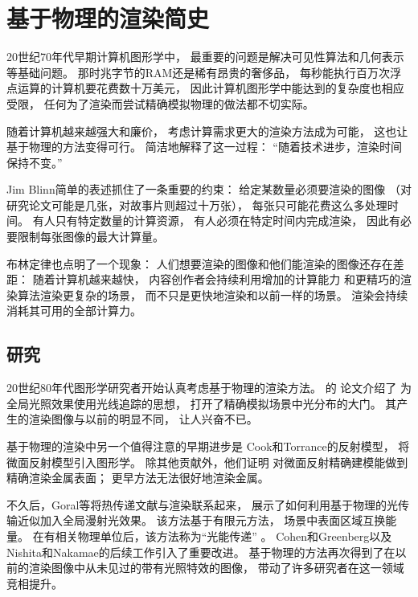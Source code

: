 \section{基于物理的渲染简史}\label{sec:基于物理的渲染简史}

20世纪70年代早期计算机图形学中，
最重要的问题是解决可见性算法和几何表示等基础问题。
那时兆字节的RAM还是稀有昂贵的奢侈品，
每秒能执行百万次浮点运算的计算机要花费数十万美元，
因此计算机图形学中能达到的复杂度也相应受限，
任何为了渲染而尝试精确模拟物理的做法都不切实际。

随着计算机越来越强大和廉价，
考虑计算需求更大的渲染方法成为可能，
这也让基于物理的方法变得可行。
简洁地解释了这一过程：
“随着技术进步，渲染时间保持不变。”

Jim Blinn简单的表述抓住了一条重要的约束：
给定某数量必须要渲染的图像
（对研究论文可能是几张，对故事片则超过十万张），
每张只可能花费这么多处理时间。
有人只有特定数量的计算资源，
有人必须在特定时间内完成渲染，
因此有必要限制每张图像的最大计算量。

布林定律也点明了一个现象：
人们想要渲染的图像和他们能渲染的图像还存在差距：
随着计算机越来越快，
内容创作者会持续利用增加的计算能力
和更精巧的渲染算法渲染更复杂的场景，
而不只是更快地渲染和以前一样的场景。
渲染会持续消耗其可用的全部计算力。

\subsection{研究}\label{sub:研究}
20世纪80年代图形学研究者开始认真考虑基于物理的渲染方法。
\citeauthor{10.1145/358876.358882}的
论文\parencite*{10.1145/358876.358882}介绍了
为全局光照效果使用光线追踪的思想，
打开了精确模拟场景中光分布的大门。
其产生的渲染图像与以前的明显不同，
让人兴奋不已。

基于物理的渲染中另一个值得注意的早期进步是
Cook和Torrance的反射模型\parencite*{10.1145/800224.806819,10.1145/357290.357293}，
将微面反射模型引入图形学。
除其他贡献外，他们证明
对微面反射精确建模能做到精确渲染金属表面；
更早方法无法很好地渲染金属。

不久后，Goral等\parencite*{10.1145/800031.808601}将热传递文献与渲染联系起来，
展示了如何利用基于物理的光传输近似加入全局漫射光效果。
该方法基于有限元方法，
场景中表面区域互换能量。
在有相关物理单位后，该方法称为“光能传递”
。
Cohen和Greenberg\parencite*{10.1145/325334.325171}以及
Nishita和Nakamae\parencite*{10.1145/325334.325169}的后续工作引入了重要改进。
基于物理的方法再次得到了在以前的渲染图像中从未见过的带有光照特效的图像，
带动了许多研究者在这一领域竞相提升。

